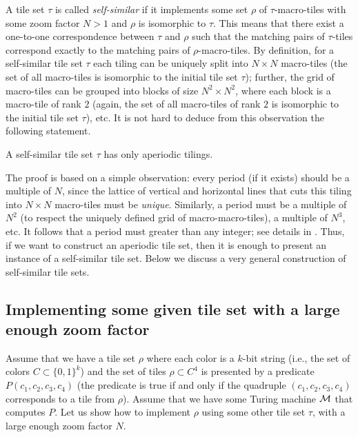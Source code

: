 \documentclass[runningheads]{llncs}
\begin{document}
A  tile set $\tau$ is called \emph{self-similar} if it implements some set $\rho$ of $\tau$-macro-tiles with some zoom factor $N>1$ and $\rho$ is isomorphic to $\tau$. 
This means that there exist a one-to-one correspondence between $\tau$ and $\rho$ such that
the matching pairs of $\tau$-tiles correspond exactly to the matching pairs of $\rho$-macro-tiles.
By definition, for a  self-similar tile set $\tau$ each tiling can be uniquely split into $N\times N$ macro-tiles (the set of all macro-tiles is isomorphic to the initial tile set $\tau$);  further, the grid of macro-tiles can be grouped into blocks of size $N^2\times N^2$, where each block is a macro-tile of rank $2$ (again, the set of all macro-tiles of rank $2$ is isomorphic to the initial tile set $\tau$), etc. It is not hard to deduce from this observation the following statement.
\begin{proposition}[folklore] \label{thm-folklore}
A self-similar tile set $\tau$ has only aperiodic tilings.
 \end{proposition}
The proof is based on a simple observation: every period (if it exists) should be a multiple of $N$, since  the lattice of vertical and horizontal lines that cuts this tiling into $N\times N$ macro-tiles must be \emph{unique}. Similarly, a period must be a  multiple of $N^2$ (to respect the uniquely defined grid of macro-macro-tiles), a  multiple of $N^3$, etc. It follows that a period must greater than any integer; see details in \cite{drs}.
Thus, if we want to construct an aperiodic tile set, then it is enough to present an instance of a self-similar tile set.
 Below we discuss a very general construction of self-similar tile sets.
 
 \subsection{Implementing some given tile set with a large enough zoom factor}


 Assume that we have a tile set $\rho$ where each color is a $k$-bit string (i.e., the set of colors $C \subset \{0,1\}^k$) and the set of tiles $\rho \subset C^4$ is presented by a predicate $P(c_1,c_2,c_3,c_4)$ (the predicate is true if and only if the quadruple $(c_1,c_2,c_3,c_4)$ corresponds to a tile from $\rho$). Assume that we have some Turing machine $\cal M$ that computes $P$. Let us show how to implement $\rho$ using some other tile set $\tau$, with a large enough zoom factor $N$.
 
\end{document}
